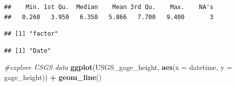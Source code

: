 \documentclass[]{article}
\newenvironment{Shaded}{\begin{snugshade}}{\end{snugshade}}
\newcommand{\CommentTok}[1]{\textcolor[rgb]{0.56,0.35,0.01}{\textit{#1}}}
\newcommand{\DataTypeTok}[1]{\textcolor[rgb]{0.13,0.29,0.53}{#1}}
\newcommand{\KeywordTok}[1]{\textcolor[rgb]{0.13,0.29,0.53}{\textbf{#1}}}
\newcommand{\NormalTok}[1]{#1}
\newcommand{\OperatorTok}[1]{\textcolor[rgb]{0.81,0.36,0.00}{\textbf{#1}}}
\newcommand{\StringTok}[1]{\textcolor[rgb]{0.31,0.60,0.02}{#1}}
\begin{document}
\begin{Shaded}
\end{Shaded}

\begin{verbatim}
##    Min. 1st Qu.  Median    Mean 3rd Qu.    Max.    NA's 
##   0.260   3.950   6.350   5.866   7.700   9.400       3
\end{verbatim}

\begin{Shaded}
\end{Shaded}

\begin{verbatim}
## [1] "factor"
\end{verbatim}

\begin{Shaded}
\end{Shaded}

\begin{verbatim}
## [1] "Date"
\end{verbatim}

\begin{Shaded}
\begin{Highlighting}[]
\CommentTok{#explore USGS data}
\KeywordTok{ggplot}\NormalTok{(USGS_gage_height, }\KeywordTok{aes}\NormalTok{(}\DataTypeTok{x =}\NormalTok{ datetime, }\DataTypeTok{y =}\NormalTok{ gage_height)) }\OperatorTok{+}
\StringTok{  }\KeywordTok{geom_line}\NormalTok{()}
\end{Highlighting}
\end{Shaded}
\end{document}
